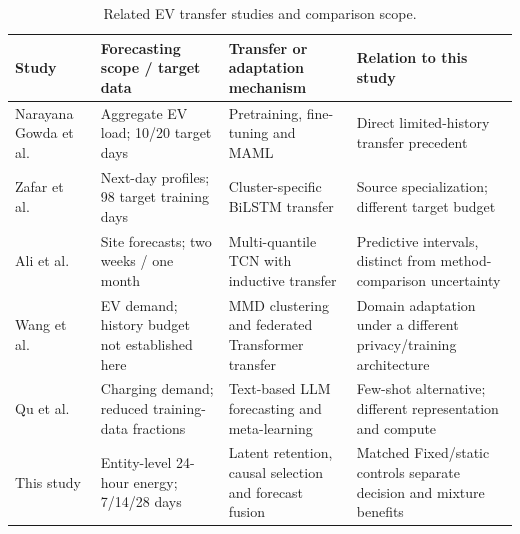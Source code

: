 \begin{table}[t]
\centering\footnotesize
\caption{Related EV transfer studies and comparison scope.}\label{tab:related}
\begin{tabularx}{\textwidth}{@{}>{\raggedright\arraybackslash}p{}>{\raggedright\arraybackslash}p{}>{\raggedright\arraybackslash}p{}X@{}}\toprule
Study & Forecasting scope / target data & Transfer or adaptation mechanism & Relation to this study\\\midrule
Narayana Gowda et al.\ \cite{gowda2026} & Aggregate EV load; 10/20 target days & Pretraining, fine-tuning and MAML & Direct limited-history transfer precedent\\
Zafar et al.\ \cite{zafar2025} & Next-day profiles; 98 target training days & Cluster-specific BiLSTM transfer & Source specialization; different target budget\\
Ali et al.\ \cite{ali2024} & Site forecasts; two weeks / one month & Multi-quantile TCN with inductive transfer & Predictive intervals, distinct from method-comparison uncertainty\\
Wang et al.\ \cite{wang2025federated} & EV demand; history budget not established here & MMD clustering and federated Transformer transfer & Domain adaptation under a different privacy/training architecture\\
Qu et al.\ \cite{qu2024chatev} & Charging demand; reduced training-data fractions & Text-based LLM forecasting and meta-learning & Few-shot alternative; different representation and compute\\
This study & Entity-level 24-hour energy; 7/14/28 days & Latent retention, causal selection and forecast fusion & Matched Fixed/static controls separate decision and mixture benefits\\
\bottomrule\end{tabularx}
\end{table}

